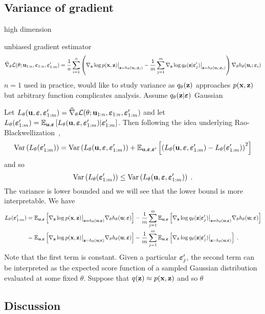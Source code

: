 \documentclass[10pt]{article}
\begin{document}
\subsection{Variance of gradient}

\todo high dimension

unbiased \elbo gradient estimator
\[
\widehat{\nabla}_\theta\mathcal{L}(\theta;\mathbf{u}_{1:n},\bm{\varepsilon}_{1:n},\bm{\varepsilon}_{1:m}') = \frac{1}{n}\sum_{i=1}^n \left(\nabla_{\mathbf{z}}\log p(\mathbf{x},\mathbf{z})\big|_{\mathbf{z}=h_\theta(\mathbf{u}_i;\bm{\varepsilon}_i)} - \frac{1}{m}\sum_{j=1}^m \nabla_{\mathbf{z}}\log q_\theta(\mathbf{z}|\bm{\varepsilon}_j')\big|_{\mathbf{z}=h_\theta(\mathbf{u}_i;\bm{\varepsilon}_i)} \right)\nabla_\theta h_\theta(\mathbf{u}_i;\bm{\varepsilon}_i)
\]
$n=1$ used in practice, would like to study variance as $q_\theta(\mathbf{z})$ approaches $p(\mathbf{x},\mathbf{z})$ but arbitrary function complicates analysis. Assume $q_\theta(\mathbf{z}|\bm{\varepsilon})$ Gaussian

Let $L_\theta(\mathbf{u},\bm{\varepsilon},\bm{\varepsilon}_{1:m}')=\widehat{\nabla}_\theta\mathcal{L}(\theta;\mathbf{u}_{1:n},\bm{\varepsilon}_{1:n},\bm{\varepsilon}_{1:m}')$ and let $L_\theta(\bm{\varepsilon}_{1:m}')=\mathbb{E}_{\mathbf{u},\bm{\varepsilon}}\left[L_\theta(\mathbf{u},\bm{\varepsilon},\bm{\varepsilon}_{1:m}')|\bm{\varepsilon}_{1:m}'\right]$. Then following the idea underlying Rao-Blackwellization~\citep{Ranganath:2014},
\[
\mathrm{Var}\left(L_\theta(\bm{\varepsilon}_{1:m}')\right) = \mathrm{Var}\left(L_\theta(\mathbf{u},\bm{\varepsilon},\bm{\varepsilon}_{1:m}')\right) + \mathbb{E}_{\mathbf{u},\bm{\varepsilon},\bm{\varepsilon}'}\left[\left(L_\theta(\mathbf{u},\bm{\varepsilon},\bm{\varepsilon}_{1:m}')-L_\theta(\bm{\varepsilon}_{1:m}')\right)^2\right]
\]
and so
\[
\mathrm{Var}\left(L_\theta(\bm{\varepsilon}_{1:m}')\right) \leq \mathrm{Var}\left(L_\theta(\mathbf{u},\bm{\varepsilon},\bm{\varepsilon}_{1:m}')\right) \;.
\]
The variance is lower bounded and we will see that the lower bound is more interpretable. We have
\begin{align*}
L_\theta(\bm{\varepsilon}_{1:m}') &= \mathbb{E}_{\mathbf{u},\bm{\varepsilon}}\left[\nabla_{\mathbf{z}}\log p(\mathbf{x},\mathbf{z})\big|_{\mathbf{z}=h_\theta(\mathbf{u};\bm{\varepsilon})}\nabla_\theta h_\theta(\mathbf{u};\bm{\varepsilon})\right] - \frac{1}{m}\sum_{j=1}^m\mathbb{E}_{\mathbf{u},\bm{\varepsilon}}\left[\nabla_{\mathbf{z}}\log q_\theta(\mathbf{z}|\bm{\varepsilon}_j')\big|_{\mathbf{z}=h_\theta(\mathbf{u};\bm{\varepsilon})} \nabla_\theta h_\theta(\mathbf{u};\bm{\varepsilon})\right] \\
&= \mathbb{E}_{\mathbf{u},\bm{\varepsilon}}\left[\nabla_{\mathbf{z}}\log p(\mathbf{x},\mathbf{z})\big|_{\mathbf{z}=h_\theta(\mathbf{u};\bm{\varepsilon})}\nabla_\theta h_\theta(\mathbf{u};\bm{\varepsilon})\right] - \frac{1}{m}\sum_{j=1}^m\mathbb{E}_{\mathbf{u},\bm{\varepsilon}}\left[\nabla_\theta\log q_\theta(\mathbf{z}|\bm{\varepsilon}_j')\big|_{\mathbf{z}=h_\theta(\mathbf{u};\bm{\varepsilon})}\right] \;.
\end{align*}
Note that the first term is constant. Given a particular $\bm{\varepsilon}_j'$, the second term can be interpreted as the expected score function of a sampled Gaussian distribution evaluated at some fixed $\theta$. Suppose that $q(\mathbf{z})\approx p(\mathbf{x},\mathbf{z})$ and so \todo $\theta$


\subsection{Discussion}


\newpage




\end{document}
